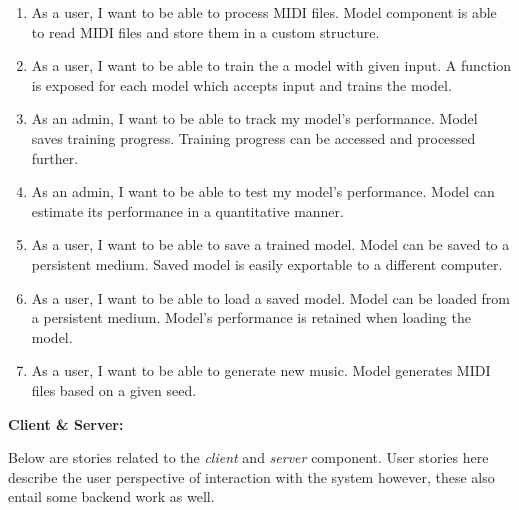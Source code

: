 \documentclass{article}
\begin{document}
\begin{enumerate}
    \item
          As a user, I want to be able to process MIDI files.
          \AC Model component is able to read MIDI files and store them in a custom structure.

    \item
          As a user, I want to be able to train the a model with given input.
          \AC A function is exposed for each model which accepts input and trains the model.

    \item
          As an admin, I want to be able to track my model's performance.
          \AC Model saves training progress.
          \AC Training progress can be accessed and processed further.

    \item
          As an admin, I want to be able to test my model's performance.
          \AC Model can estimate its performance in a quantitative manner.

    \item
          As a user, I want to be able to save a trained model.
          \AC Model can be saved to a persistent medium.
          \AC Saved model is easily exportable to a different computer.

    \item
          As a user, I want to be able to load a saved model.
          \AC Model can be loaded from a persistent medium.
          \AC Model's performance is retained when loading the model.

    \item
          As a user, I want to be able to generate new music.
          \AC Model generates MIDI files based on a given seed.
\end{enumerate}


\textbf{\large Client \& Server:}

Below are stories related to the \textit{client} and \textit{server} component. User stories here describe the user perspective of interaction with the system however, these also entail some backend work as well.
\end{document}

